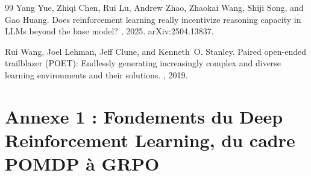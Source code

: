 \documentclass[11pt,a4paper]{article}
\begin{document}
\begin{thebibliography}{99}
Yang Yue, Zhiqi Chen, Rui Lu, Andrew Zhao, Zhaokai Wang, Shiji Song, and Gao Huang.
\newblock Does reinforcement learning really incentivize reasoning capacity in LLMs beyond the base model?
, 2025. arXiv:2504.13837.

Rui Wang, Joel Lehman, Jeff Clune, and Kenneth~O. Stanley.
\newblock Paired open-ended trailblazer (POET): Endlessly generating increasingly complex and diverse learning environments and their solutions.
, 2019.




%
%

\end{thebibliography}














\appendix



\newpage
\section{Annexe 1 : Fondements du Deep Reinforcement Learning, du cadre POMDP à GRPO}
\label{annexe:maths_rl}
\end{document}
